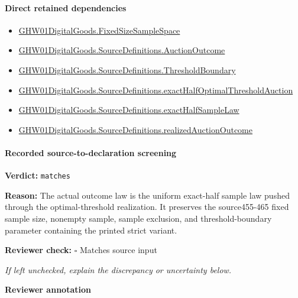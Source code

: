 \documentclass[10pt]{article}
\newcommand{\reviewerbox}{%
  \par\noindent\fbox{\parbox{0.96\linewidth}{\rule{0pt}{0.38in}}}\par
}
\newcommand{\reviewmatch}[1]{%
  \par\noindent\textbf{Reviewer check:} $\square$\; #1\par
  \noindent\emph{If left unchecked, explain the discrepancy or uncertainty below.}\par
}
\begin{document}
\paragraph{Direct retained dependencies}
\begin{itemize}\raggedright
\item \hyperlink{governing-declaration-54cc4fd1a8d109e5}{GHW01\allowbreak{}Digital\allowbreak{}Goods.\allowbreak{}Fixed\allowbreak{}Size\allowbreak{}Sample\allowbreak{}Space}
\item \hyperlink{paper-prerequisite-fc173e8d557afd08}{GHW01\allowbreak{}Digital\allowbreak{}Goods.\allowbreak{}Source\allowbreak{}Definitions.\allowbreak{}Auction\allowbreak{}Outcome}
\item \hyperlink{paper-prerequisite-4178ea3b672e0864}{GHW01\allowbreak{}Digital\allowbreak{}Goods.\allowbreak{}Source\allowbreak{}Definitions.\allowbreak{}Threshold\allowbreak{}Boundary}
\item \hyperlink{paper-prerequisite-2b5e3b1496d59a63}{GHW01\allowbreak{}Digital\allowbreak{}Goods.\allowbreak{}Source\allowbreak{}Definitions.\allowbreak{}exact\allowbreak{}Half\allowbreak{}Optimal\allowbreak{}Threshold\allowbreak{}Auction}
\item \hyperlink{governing-declaration-b9c23d6d120bb104}{GHW01\allowbreak{}Digital\allowbreak{}Goods.\allowbreak{}Source\allowbreak{}Definitions.\allowbreak{}exact\allowbreak{}Half\allowbreak{}Sample\allowbreak{}Law}
\item \hyperlink{governing-declaration-1f8637b360987e0b}{GHW01\allowbreak{}Digital\allowbreak{}Goods.\allowbreak{}Source\allowbreak{}Definitions.\allowbreak{}realized\allowbreak{}Auction\allowbreak{}Outcome}
\end{itemize}
\paragraph{Recorded source-to-declaration screening}
\textbf{Verdict:} \texttt{matches}
\\
{\raggedright
\textbf{Reason:} The actual outcome law is the uniform exact-\allowbreak{}half sample law pushed through the optimal-\allowbreak{}threshold realization.\allowbreak{} It preserves the source455-\allowbreak{}465 fixed sample size, nonempty sample, sample exclusion, and threshold-\allowbreak{}boundary parameter containing the printed strict variant.\allowbreak{}
\par}
\reviewmatch{Matches source input}
\noindent\textbf{Reviewer annotation}\par
\reviewerbox
\clearpage
\hypertarget{paper-prerequisite-2cfbf90ece921554}{}
\end{document}
